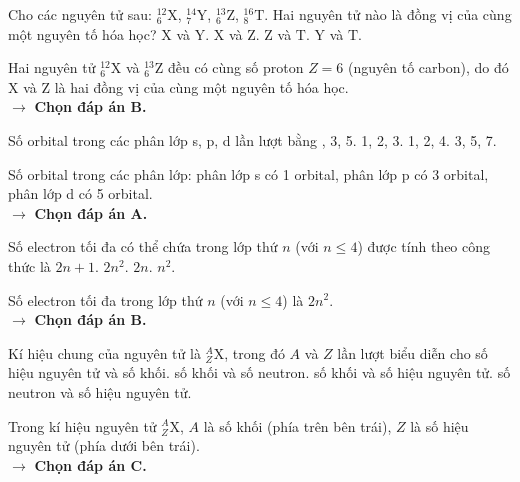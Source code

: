 \documentclass[11pt,a4paper]{article}
\begin{document}
\begin{ex}%
Cho các nguyên tử sau: $^{12}_{6}\text{X}$, $^{14}_{7}\text{Y}$, $^{13}_{6}\text{Z}$, $^{16}_{8}\text{T}$. Hai nguyên tử nào là đồng vị của cùng một nguyên tố hóa học?
\choice
{$\text{X}$ và $\text{Y}$.}
{\True $\text{X}$ và $\text{Z}$.}
{$\text{Z}$ và $\text{T}$.}
{$\text{Y}$ và $\text{T}$.}
\begin{loigiai}
Hai nguyên tử $^{12}_{6}\text{X}$ và $^{13}_{6}\text{Z}$ đều có cùng số proton $Z = 6$ (nguyên tố carbon), do đó $\text{X}$ và $\text{Z}$ là hai đồng vị của cùng một nguyên tố hóa học.\\
$\rightarrow$ \textbf{Chọn đáp án B.}
\end{loigiai}
\end{ex}

\begin{ex}%
Số orbital trong các phân lớp s, p, d lần lượt bằng
\choice
{, 3, 5.}
{1, 2, 3.}
{1, 2, 4.}
{3, 5, 7.}
\begin{loigiai}
Số orbital trong các phân lớp: phân lớp s có 1 orbital, phân lớp p có 3 orbital, phân lớp d có 5 orbital.\\
$\rightarrow$ \textbf{Chọn đáp án A.}
\end{loigiai}
\end{ex}

\begin{ex}%
Số electron tối đa có thể chứa trong lớp thứ $n$ (với $n \le 4$) được tính theo công thức là
\choice
{$2n + 1$.}
{\True $2n^2$.}
{$2n$.}
{$n^2$.}
\begin{loigiai}
Số electron tối đa trong lớp thứ $n$ (với $n \le 4$) là $2n^2$.\\
$\rightarrow$ \textbf{Chọn đáp án B.}
\end{loigiai}
\end{ex}

\begin{ex}%
Kí hiệu chung của nguyên tử là $^{A}_{Z}\text{X}$, trong đó $A$ và $Z$ lần lượt biểu diễn cho
\choice
{số hiệu nguyên tử và số khối.}
{số khối và số neutron.}
{\True số khối và số hiệu nguyên tử.}
{số neutron và số hiệu nguyên tử.}
\begin{loigiai}
Trong kí hiệu nguyên tử $^{A}_{Z}\text{X}$, $A$ là số khối (phía trên bên trái), $Z$ là số hiệu nguyên tử (phía dưới bên trái).\\
$\rightarrow$ \textbf{Chọn đáp án C.}
\end{loigiai}
\end{ex}
\end{document}
